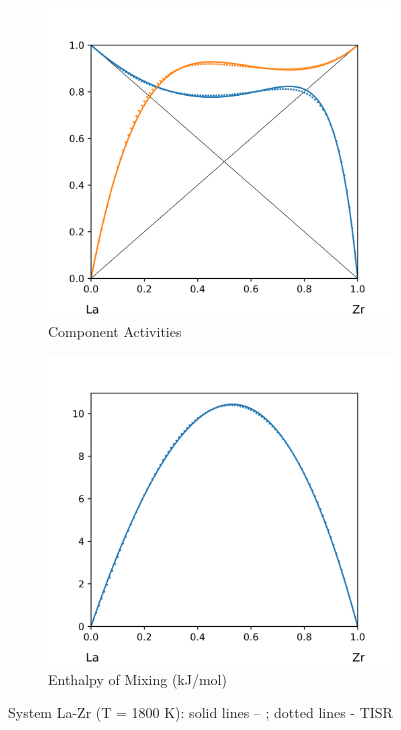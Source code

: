 \documentclass[12pt,abstract]{scrartcl}
\begin{document}
\begin{figure}[h]
\centering
\begin{subfigure}{.5\textwidth}
  \centering
  \includegraphics[width=1\linewidth]{La-Zr_Activity}
  \caption{Component Activities}
  \label{fig:sub1}
\end{subfigure}%
\begin{subfigure}{.5\textwidth}
  \centering
  \includegraphics[width=1\linewidth]{La-Zr_Enthalpy}
  \caption{Enthalpy of Mixing (kJ/mol)}
  \label{fig:sub2}
\end{subfigure}
\caption{System La-Zr (T = 1800 K): solid lines -- \cite{La-Zr_Data}; dotted lines - TISR}
\label{fig:La-Zr}
\end{figure}
\end{document}
